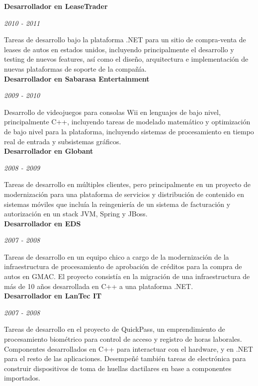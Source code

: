 \documentclass[a4paper,11pt]{article}
\begin{document}
\noindent \textbf{Desarrollador en LeaseTrader}

\noindent \emph{2010 - 2011}

\noindent Tareas de desarrollo bajo la plataforma .NET para un sitio de
compra-venta de leases de autos en estados unidos, incluyendo principalmente el
desarrollo y testing de nuevos features, así como el diseño, arquitectura e
implementación de nuevas plataformas de soporte de la compañía. \\

\noindent \textbf{Desarrollador en Sabarasa Entertainment}

\noindent \emph{2009 - 2010}

\noindent Desarrollo de videojuegos para consolas Wii en lenguajes de bajo
nivel, principalmente C++, incluyendo tareas de modelado matemático y
optimización de bajo nivel para la plataforma, incluyendo sistemas de
procesamiento en tiempo real de entrada y subsistemas gráficos. \\

\noindent \textbf{Desarrollador en Globant}

\noindent \emph{2008 - 2009}

\noindent Tareas de desarrollo en múltiples clientes, pero principalmente en un
proyecto de modernización para una plataforma de servicios y distribución de
contenido en sistemas móviles que incluía la reingeniería de un sistema de
facturación y autorización en un stack JVM, Spring y JBoss. \\

\noindent \textbf{Desarrollador en EDS}

\noindent \emph{2007 - 2008}

\noindent Tareas de desarrollo en un equipo chico a cargo de la modernización
de la infraestructura de procesamiento de aprobación de créditos para la compra
de autos en GMAC. El proyecto consistía en la migración de una infraestructura
de más de 10 años desarrollada en C++ a una plataforma .NET. \\

\noindent \textbf{Desarrollador en LanTec IT}

\noindent \emph{2007 - 2008}

\noindent Tareas de desarrollo en el proyecto de QuickPass, un emprendimiento de procesamiento biométrico para control de acceso y registro de horas laborales. Componentes desarrollados en C++ para interactuar con el hardware, y en .NET para el resto de las aplicaciones. Desempeñé también tareas de electrónica para construir dispositivos de toma de huellas dactilares en base a componentes importados. \\
\end{document}
